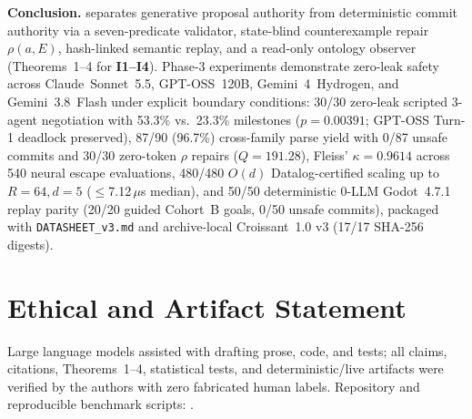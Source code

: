 \textbf{Conclusion.} \system{} separates generative proposal authority from deterministic commit authority via a seven-predicate validator, state-blind counterexample repair $\rho(a,E)$, hash-linked semantic replay, and a read-only ontology observer (Theorems~1--4 for \textbf{I1--I4}). Phase-3 experiments demonstrate zero-leak safety across Claude~Sonnet~5.5, GPT-OSS~120B, Gemini~4~Hydrogen, and Gemini~3.8~Flash under explicit boundary conditions: 30/30 zero-leak scripted 3-agent negotiation with 53.3\% vs.\ 23.3\% milestones ($p{=}0.00391$; GPT-OSS Turn-1 deadlock preserved), 87/90 (96.7\%) cross-family parse yield with 0/87 unsafe commits and 30/30 zero-token $\rho$ repairs ($Q{=}191.28$), Fleiss' $\kappa{=}0.9614$ across 540 neural escape evaluations, 480/480 $O(d)$ Datalog-certified scaling up to $R{=}64, d{=}5$ ($\le$7.12\,$\mu$s median), and 50/50 deterministic 0-LLM Godot~4.7.1 replay parity (20/20 guided Cohort~B goals, 0/50 unsafe commits), packaged with \texttt{DATASHEET\_v3.md} and archive-local Croissant~1.0 v3 (17/17 SHA-256 digests).

\section*{Ethical and Artifact Statement}
Large language models assisted with drafting prose, code, and tests; all claims, citations, Theorems~1--4, statistical tests, and deterministic/live artifacts were verified by the authors with zero fabricated human labels. Repository and reproducible benchmark scripts: \RepoURL.
